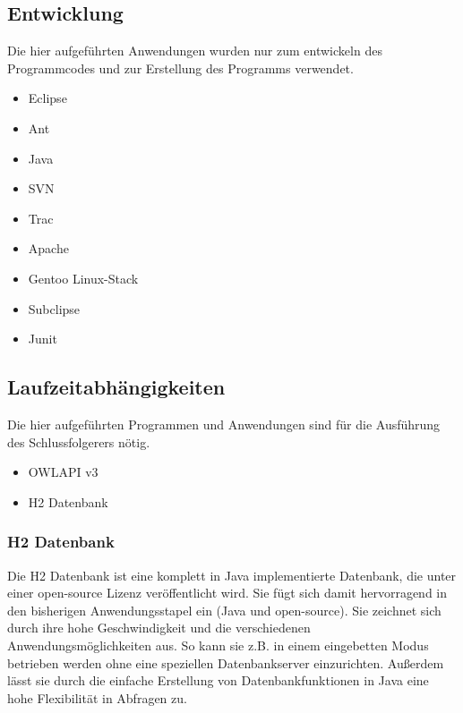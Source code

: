 \subsection{Entwicklung}

Die hier aufgeführten Anwendungen wurden nur zum entwickeln des Programmcodes und zur Erstellung des Programms verwendet.
\begin{itemize}
  \item Eclipse
  \item Ant
  \item Java
  \item SVN
  \item Trac
  \item Apache
  \item Gentoo Linux-Stack
  \item Subclipse
  \item Junit
\end{itemize}

\subsection{Laufzeitabhängigkeiten}
Die hier aufgeführten Programmen und Anwendungen sind für die Ausführung des Schlussfolgerers nötig.
\begin{itemize}
  \item OWLAPI v3 \cite{Horridge2009}
  \item H2 Datenbank
\end{itemize}
 
\subsubsection*{H2 Datenbank}
Die H2 Datenbank ist eine komplett in Java implementierte Datenbank, die unter einer open-source Lizenz veröffentlicht wird. Sie fügt sich damit hervorragend in den bisherigen Anwendungsstapel ein (Java und open-source). Sie zeichnet sich durch ihre hohe Geschwindigkeit und die verschiedenen Anwendungsmöglichkeiten aus. So kann sie z.B. in einem eingebetten Modus betrieben werden ohne eine speziellen Datenbankserver einzurichten. Außerdem lässt sie durch die einfache Erstellung von Datenbankfunktionen in Java eine hohe Flexibilität in Abfragen zu.

